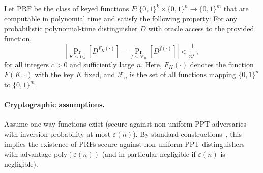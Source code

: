 \documentclass[twoside]{article}
\begin{document}
\begin{definition}
Let $\mathrm{PRF}$ be the class of keyed functions $F: \{0,1\}^k \times \{0,1\}^n \to \{0,1\}^m$ that are computable in polynomial time and satisfy the following property: For any probabilistic polynomial-time distinguisher $D$ with oracle access to the provided function,
    \begin{equation}
        |\Pr_{K \sim U_k}[D^{F_K(\cdot)}] - \Pr_{f \sim \mathcal{F}_n}[D^{f(\cdot)}]| < \frac{1}{n^c},
    \end{equation}
for all integers $c > 0$ and sufficiently large $n$. Here, $F_K(\cdot)$ denotes the function $F(K, \cdot)$ with the key $K$ fixed, and $\mathcal{F}_n$ is the set of all functions mapping $\{0,1\}^n$ to $\{0,1\}^m$.
\end{definition}

\paragraph{Cryptographic assumptions.} Assume one-way functions exist (secure against non-uniform PPT adversaries with inversion probability at most 
$\varepsilon(n)$). By standard constructions~\citep{haastad1999pseudorandom}, this implies the existence of PRFs secure against non-uniform PPT distinguishers with advantage $\mathrm{poly}(\varepsilon(n))$ (and in particular negligible if $\varepsilon(n)$ is negligible).

%
\end{document}
